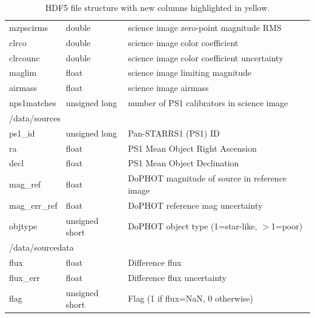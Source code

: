 \documentclass[11pt]{article}
\begin{document}
\begin{table}[ht!]
\begin{tabular}{ |p{3.5cm}p{2.5cm}p{9cm}| }
     \hspace{1.0cm}mzpscirms   &   double           &   science image zero-point magnitude RMS \\
     \hspace{1.0cm}clrco       &   double           &   science image color coefficient \\
     \hspace{1.0cm}clrcounc    &   double           &   science image color coefficient uncertainty \\
     \hspace{1.0cm}maglim      &   float            &   science image limiting magnitude \\
     \hspace{1.0cm}airmass     &   float            &   science image airmass \\
     \hspace{1.0cm}nps1matches &   unsigned long    &   number of PS1 calibrators in science image \\
     \hline
     \multicolumn{3}{|l|}{\hspace{0.5cm}/data/sources} \\
     \hspace{1.0cm}ps1\_id       &   unsigned long   &   Pan-STARRS1 (PS1) ID \\
     \hspace{1.0cm}ra            &   float           &   PS1 Mean Object Right Ascension \\
     \hspace{1.0cm}decl          &   float           &   PS1 Mean Object Declination \\
     \hspace{1.0cm}mag\_ref      &   float           &   DoPHOT magnitude of source in reference image \\
     \hspace{1.0cm}mag\_err\_ref &   float           &   DoPHOT reference mag uncertainty \\
     \hspace{1.0cm}objtype       &   unsigned short  &   DoPHOT object type (1=star-like, $>$1=poor) \\
     \hline
     \multicolumn{3}{|l|}{\hspace{0.5cm}/data/sourcedata} \\
     \hspace{1.0cm}flux       &   float           &   Difference flux \\
     \hspace{1.0cm}flux\_err  &   float           &   Difference flux uncertainty \\
     \hspace{1.0cm}flag       &   unsigned short  &   Flag (1 if flux=NaN, 0 otherwise) \\
     \hline
    \end{tabular}
    \caption{HDF5 file structure with new columns highlighted in yellow.}
    \label{tab:matchfile}
    \end{table}
\end{document}
